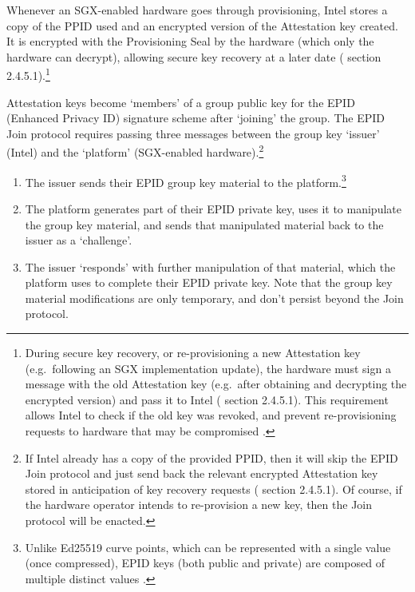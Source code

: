 Whenever an SGX-enabled hardware goes through provisioning, Intel stores a copy of the PPID used and an encrypted version of the Attestation key created. It is encrypted with the Provisioning Seal by the hardware (which only the hardware can decrypt), allowing secure key recovery at a later date (\cite{sgx-extending-sgx-autonomy-and-anonymity-thesis} section 2.4.5.1).\footnote{During secure key recovery, or re-provisioning a new Attestation key (e.g.\ following an SGX implementation update), the hardware must sign a message with the old Attestation key (e.g.\ after obtaining and decrypting the encrypted version) and pass it to Intel (\cite{sgx-extending-sgx-autonomy-and-anonymity-thesis} section 2.4.5.1). This requirement allows Intel to check if the old key was revoked, and prevent re-provisioning requests to hardware that may be compromised \cite{sgx-epid-provisioning-attestation}.}

Attestation keys become `members' of a group public key for the EPID (Enhanced Privacy ID) signature scheme  \cite{epid-paper} after `joining' the group. The EPID Join protocol \cite{epid-paper} requires passing three messages between the group key `issuer' (Intel) and the `platform' (SGX-enabled hardware).\footnote{If Intel already has a copy of the provided PPID, then it will skip the EPID Join protocol and just send back the relevant encrypted Attestation key stored in anticipation of key recovery requests (\cite{sgx-extending-sgx-autonomy-and-anonymity-thesis} section 2.4.5.1). Of course, if the hardware operator intends to re-provision a new key, then the Join protocol will be enacted.}
\begin{enumerate}
    \item The issuer sends their EPID group key material to the platform.\footnote{Unlike Ed25519 curve points, which can be represented with a single value (once compressed), EPID keys (both public and private) are composed of multiple distinct values \cite{epid-paper}.}
    \item The platform generates part of their EPID private key, uses it to manipulate the group key material, and sends that manipulated material back to the issuer as a `challenge'.
    \item The issuer `responds' with further manipulation of that material, which the platform uses to complete their EPID private key. Note that the group key material modifications are only temporary, and don't persist beyond the Join protocol.
\end{enumerate}

